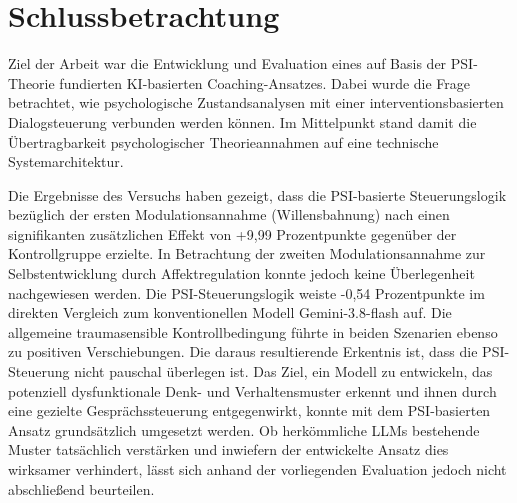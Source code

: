 \chapter{Schlussbetrachtung} \label{chap:6}

Ziel der Arbeit war die Entwicklung und Evaluation eines auf Basis der PSI-Theorie fundierten KI-basierten Coaching-Ansatzes. Dabei wurde die Frage betrachtet, wie psychologische Zustandsanalysen mit einer interventionsbasierten Dialogsteuerung verbunden werden können. Im Mittelpunkt stand damit die Übertragbarkeit psychologischer Theorieannahmen auf eine technische Systemarchitektur.

Die Ergebnisse des Versuchs haben gezeigt, dass die PSI-basierte Steuerungslogik bezüglich der ersten Modulationsannahme (Willensbahnung) nach \cite{Kuhl2000The} einen signifikanten zusätzlichen Effekt von +9,99 Prozentpunkte gegenüber der Kontrollgruppe erzielte.
In Betrachtung der zweiten Modulationsannahme zur Selbstentwicklung durch Affektregulation konnte jedoch keine Überlegenheit nachgewiesen werden. Die PSI-Steuerungslogik weiste -0,54 Prozentpunkte im direkten Vergleich zum konventionellen Modell Gemini-3.8-flash auf.
Die allgemeine traumasensible Kontrollbedingung führte in beiden Szenarien ebenso zu positiven Verschiebungen. Die daraus resultierende Erkentnis ist, dass die PSI-Steuerung nicht pauschal überlegen ist. 
Das Ziel, ein Modell zu entwickeln, das potenziell dysfunktionale Denk- und Verhaltensmuster erkennt und ihnen durch eine gezielte Gesprächssteuerung entgegenwirkt, konnte mit dem PSI-basierten Ansatz grundsätzlich umgesetzt werden. Ob herkömmliche LLMs bestehende Muster tatsächlich verstärken und inwiefern der entwickelte Ansatz dies wirksamer verhindert, lässt sich anhand der vorliegenden Evaluation jedoch nicht abschließend beurteilen.

